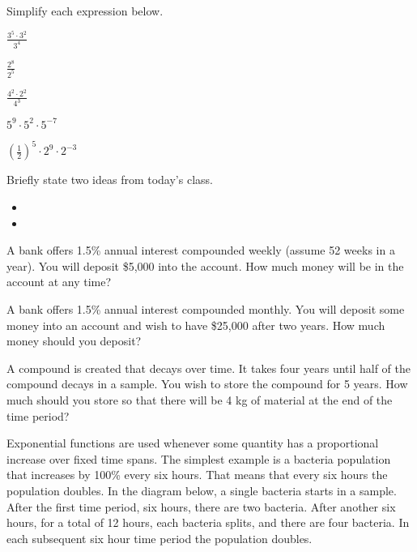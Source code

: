 \begin{problem}
  \vfill

  \clearpage

\item Simplify each expression below.
  \begin{subproblem}
  \item $\frac{3^5\cdot 3^2}{3^4}$
    \vfill
  \item $\frac{2^8}{2^5}$
    \vfill
  \item $\frac{4^2\cdot 2^2}{4^3}$
    \vfill
  \item $5^9\cdot 5^2\cdot 5^{-7}$
    \vfill
  \item $\left(\frac{1}{2}\right)^5 \cdot 2^9 \cdot 2^{-3}$
    \vfill
  \end{subproblem}

\end{problem}

\postClass

\begin{problem}
\item Briefly state two ideas from today's class.
  \begin{itemize}
  \item
  \item
  \end{itemize}
\item A bank offers 1.5\% annual interest compounded weekly (assume 52
  weeks in a year). You will deposit \$5,000 into the account. How
  much money will be in the account at any time?
\item A bank offers 1.5\% annual interest compounded monthly. You will
  deposit some money into an account and wish to have \$25,000 after
  two years. How much money should you deposit?
\item A compound is created that decays over time. It takes four years
  until half of the compound decays in a sample. You wish to store the
  compound for 5 years. How much should you store so that there will be
  4 kg of material at the end of the time period?
\end{problem}



Exponential functions are used whenever some quantity has a
proportional increase over fixed time spans. The simplest example is a
bacteria population that increases by 100\% every six hours. That
means that every six hours the population doubles. In the diagram
below, a single bacteria starts in a sample. After the first time
period, six hours, there are two bacteria. After another six hours,
for a total of 12 hours, each bacteria splits, and there are four
bacteria. In each subsequent six hour time period the population
doubles.

